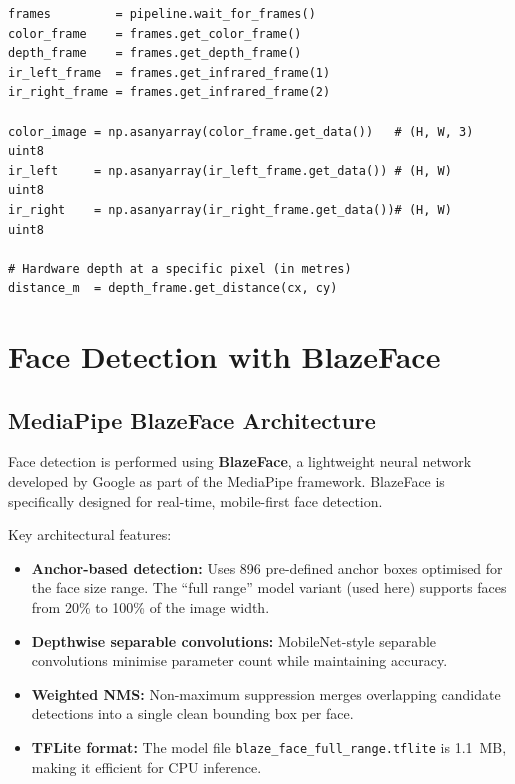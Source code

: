\documentclass[12pt, a4paper]{article}
\newcommand{\code}[1]{\texttt{\small#1}}
\begin{document}
\begin{lstlisting}[caption={Synchronised frame capture and array conversion}]
frames         = pipeline.wait_for_frames()
color_frame    = frames.get_color_frame()
depth_frame    = frames.get_depth_frame()
ir_left_frame  = frames.get_infrared_frame(1)
ir_right_frame = frames.get_infrared_frame(2)

color_image = np.asanyarray(color_frame.get_data())   # (H, W, 3) uint8
ir_left     = np.asanyarray(ir_left_frame.get_data()) # (H, W)    uint8
ir_right    = np.asanyarray(ir_right_frame.get_data())# (H, W)    uint8

# Hardware depth at a specific pixel (in metres)
distance_m  = depth_frame.get_distance(cx, cy)
\end{lstlisting}

\section{Face Detection with BlazeFace}

\subsection{MediaPipe BlazeFace Architecture}

Face detection is performed using \textbf{BlazeFace}, a lightweight neural
network developed by Google as part of the MediaPipe framework. BlazeFace is
specifically designed for real-time, mobile-first face detection.

Key architectural features:

\begin{itemize}
  \item \textbf{Anchor-based detection:} Uses 896 pre-defined anchor boxes
        optimised for the face size range. The ``full range'' model variant
        (used here) supports faces from 20\% to 100\% of the image width.

  \item \textbf{Depthwise separable convolutions:} MobileNet-style separable
        convolutions minimise parameter count while maintaining accuracy.

  \item \textbf{Weighted NMS:} Non-maximum suppression merges overlapping
        candidate detections into a single clean bounding box per face.

  \item \textbf{TFLite format:} The model file \code{blaze\_face\_full\_range.tflite}
        is 1.1~MB, making it efficient for CPU inference.
\end{itemize}
\end{document}
